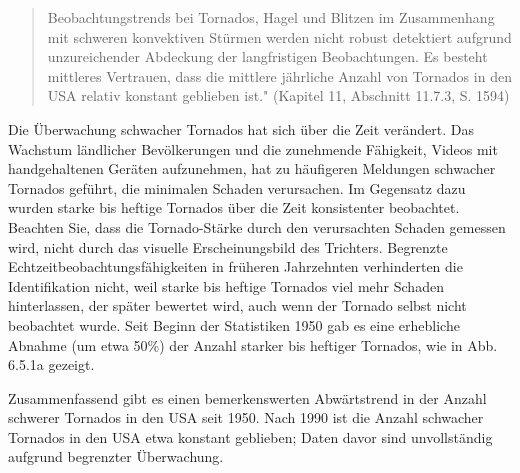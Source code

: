 \documentclass[12pt,paper=a4,DIV=12,parskip=never,chapterprefix=false,headings=standardclasses]{scrreprt}
\begin{document}
\begin{quote}
Beobachtungstrends bei Tornados, Hagel und Blitzen im Zusammenhang mit schweren konvektiven Stürmen werden nicht robust detektiert aufgrund unzureichender Abdeckung der langfristigen Beobachtungen. Es besteht mittleres Vertrauen, dass die mittlere jährliche Anzahl von Tornados in den USA relativ konstant geblieben ist." (Kapitel 11, Abschnitt 11.7.3, S. 1594)
\end{quote}

Die Überwachung schwacher Tornados hat sich über die Zeit verändert. Das Wachstum ländlicher Bevölkerungen und die zunehmende Fähigkeit, Videos mit handgehaltenen Geräten aufzunehmen, hat zu häufigeren Meldungen schwacher Tornados geführt, die minimalen Schaden verursachen. Im Gegensatz dazu wurden starke bis heftige Tornados über die Zeit konsistenter beobachtet. Beachten Sie, dass die Tornado-Stärke durch den verursachten Schaden gemessen wird, nicht durch das visuelle Erscheinungsbild des Trichters. Begrenzte Echtzeitbeobachtungsfähigkeiten in früheren Jahrzehnten verhinderten die Identifikation nicht, weil starke bis heftige Tornados viel mehr Schaden hinterlassen, der später bewertet wird, auch wenn der Tornado selbst nicht beobachtet wurde. Seit Beginn der Statistiken 1950 gab es eine erhebliche Abnahme (um etwa 50\%) der Anzahl starker bis heftiger Tornados, wie in Abb. 6.5.1a gezeigt.

Zusammenfassend gibt es einen bemerkenswerten Abwärtstrend in der Anzahl schwerer Tornados in den USA seit 1950. Nach 1990 ist die Anzahl schwacher Tornados in den USA etwa konstant geblieben; Daten davor sind unvollständig aufgrund begrenzter Überwachung.
\end{document}
